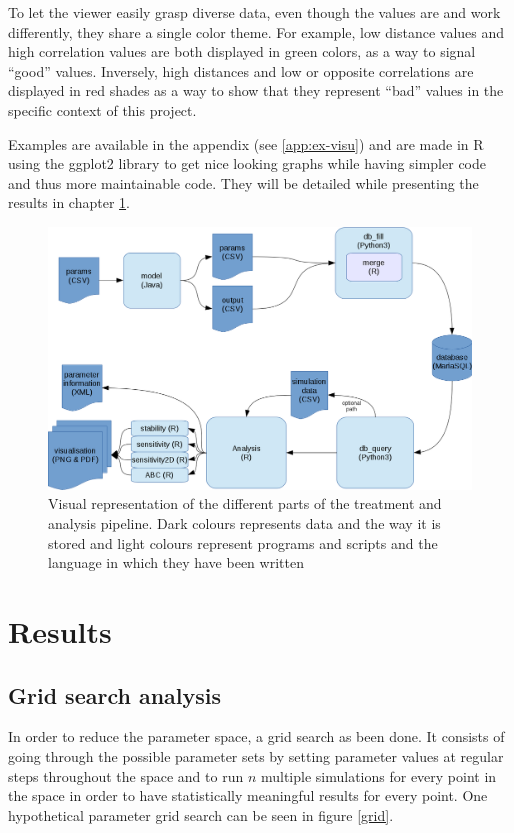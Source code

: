 \documentclass[a4paper,12pt]{report}
\begin{document}
To let the viewer easily grasp diverse data, even though the values are and work differently, they share a single color theme. For example, low distance values and high correlation values are both displayed in green colors, as a way to signal “good” values. Inversely, high distances and low or opposite correlations are displayed in red shades as a way to show that they represent “bad” values in the specific context of this project.

Examples are available in the appendix (see \ref{app:ex-visu}) and are made in R using the ggplot2 library \cite{Wic01} to get nice looking graphs while having simpler code and thus more maintainable code. They will be detailed while presenting the results in chapter \ref{chapter-results}.

\begin{figure}[!htbp]
	\hspace*{-1.5cm}
	\includegraphics[scale=0.6]{../data/workflow-2.png}
	\caption{Visual representation of the different parts of the treatment and analysis pipeline. Dark colours represents data and the way it is stored and light colours represent programs and scripts and the language in which they have been written}
	\label{workflow-2}
\end{figure}

\chapter{Results}
\label{chapter-results}
\section{Grid search analysis}
In order to reduce the parameter space, a grid search as been done. It consists of going through the possible parameter sets by setting parameter values at regular steps throughout the space and to run $n$ multiple simulations for every point in the space in order to have statistically meaningful results for every point. One hypothetical parameter grid search can be seen in figure \ref{grid}.
\end{document}
